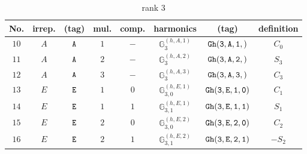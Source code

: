 \documentclass[fleqn,8pt]{jsarticle}
\begin{document}
\begin{table}[ht!]
\begin{center}
\caption{rank 3}
\renewcommand{\arraystretch}{1.3}
\begin{tabular}{cccccccc} \hline \hline
No. & irrep. & (tag) & mul. & comp. & harmonics & (tag) & definition \\ \hline
$ 10 $ & $ A $ & $ {\tt A} $ & $ 1 $ & $ - $ & $ \mathbb{G}_{3}^{(h,A,1)} $ & $ {\tt Gh(3,A,1,)} $ & $ C_{0} $ \\
$ 11 $ & $ A $ & $ {\tt A} $ & $ 2 $ & $ - $ & $ \mathbb{G}_{3}^{(h,A,2)} $ & $ {\tt Gh(3,A,2,)} $ & $ S_{3} $ \\
$ 12 $ & $ A $ & $ {\tt A} $ & $ 3 $ & $ - $ & $ \mathbb{G}_{3}^{(h,A,3)} $ & $ {\tt Gh(3,A,3,)} $ & $ C_{3} $ \\
$ 13 $ & $ E $ & $ {\tt E} $ & $ 1 $ & $ 0 $ & $ \mathbb{G}_{3,0}^{(h,E,1)} $ & $ {\tt Gh(3,E,1,0)} $ & $ C_{1} $ \\
$ 14 $ & $ E $ & $ {\tt E} $ & $ 1 $ & $ 1 $ & $ \mathbb{G}_{3,1}^{(h,E,1)} $ & $ {\tt Gh(3,E,1,1)} $ & $ S_{1} $ \\
$ 15 $ & $ E $ & $ {\tt E} $ & $ 2 $ & $ 0 $ & $ \mathbb{G}_{3,0}^{(h,E,2)} $ & $ {\tt Gh(3,E,2,0)} $ & $ C_{2} $ \\
$ 16 $ & $ E $ & $ {\tt E} $ & $ 2 $ & $ 1 $ & $ \mathbb{G}_{3,1}^{(h,E,2)} $ & $ {\tt Gh(3,E,2,1)} $ & $ - S_{2} $ \\
 \hline \hline
\end{tabular}
\end{center}
\end{table}
\end{document}
